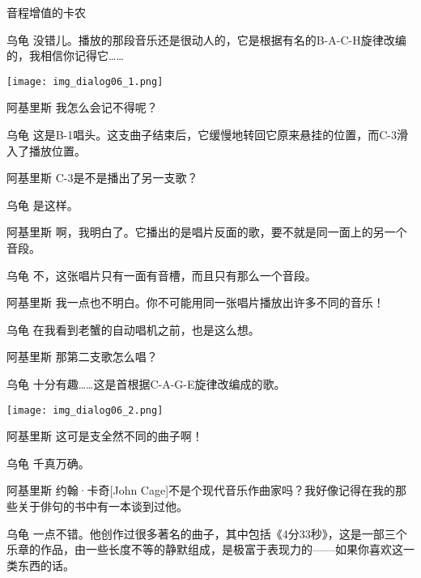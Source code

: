\begin{dialog}{音程增值的卡农}
\begin{dialogue}
\item[乌龟]没错儿。播放的那段音乐还是很动人的，它是根据有名的B-A-C-H旋律改编的，我相信你记得它……

  \begin{center}
  \texttt{[image: img\_dialog06\_1.png]}
  \end{center}

\item[阿基里斯]我怎么会记不得呢？

\item[乌龟]这是B-1唱头。这支曲子结束后，它缓慢地转回它原来悬挂的位置，而C-3滑入了播放位置。

\item[阿基里斯]C-3是不是播出了另一支歌？

\item[乌龟]是这样。

\item[阿基里斯]啊，我明白了。它播出的是唱片反面的歌，要不就是同一面上的另一个音段。

\item[乌龟]不，这张唱片只有一面有音槽，而且只有那么一个音段。

\item[阿基里斯]我一点也不明白。你不可能用同一张唱片播放出许多不同的音乐！

\item[乌龟]在我看到老蟹的自动唱机之前，也是这么想。

\item[阿基里斯]那第二支歌怎么唱？

\item[乌龟]十分有趣……这是首根据C-A-G-E旋律改编成的歌。

  \begin{center}
  \texttt{[image: img\_dialog06\_2.png]}
  \end{center}

\item[阿基里斯]这可是支全然不同的曲子啊！

\item[乌龟]千真万确。

\item[阿基里斯]约翰·卡奇[John Cage]不是个现代音乐作曲家吗？我好像记得在我的那些关于俳句的书中有一本谈到过他。

\item[乌龟]一点不错。他创作过很多著名的曲子，其中包括《4分33秒》，这是一部三个乐章的作品，由一些长度不等的静默组成，是极富于表现力的——如果你喜欢这一类东西的话。


\end{dialogue}
\end{dialog}
